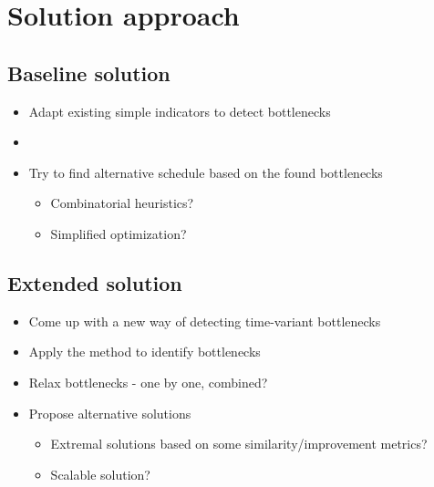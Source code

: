 \chapter{Solution approach}

\section{Baseline solution}

\begin{itemize}
    \item Adapt existing simple indicators to detect bottlenecks
    \item \TODO{}
    

    \item Try to find alternative schedule based on the found bottlenecks
    \begin{itemize}
        \item Combinatorial heuristics?
        \item Simplified optimization?
    \end{itemize}
\end{itemize}

\section{Extended solution}

\begin{itemize}
    \item Come up with a new way of detecting time-variant bottlenecks
    \item Apply the method to identify bottlenecks
    \item Relax bottlenecks - one by one, combined?
    \item Propose alternative solutions
    \begin{itemize}
        \item Extremal solutions based on some similarity/improvement metrics?
        \item Scalable solution?
    \end{itemize}
\end{itemize}
